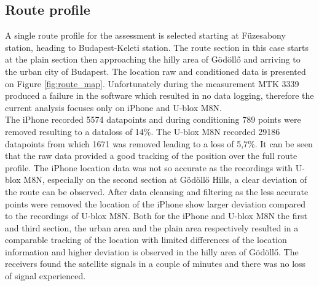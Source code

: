 \documentclass{article}
\begin{document}
		\subsection{Route profile}
			A single route profile for the assessment is selected starting at Füzesabony station, heading to Budapest-Keleti station. The route section in this case starts at the plain section then approaching the hilly area of Gödöllő and arriving to the urban city of Budapest. The location raw and conditioned data is presented on Figure \ref{fig:route_map}. Unfortunately during the measurement MTK 3339 produced a failure in the software which resulted in no data logging, therefore the current analysis focuses only on iPhone and U-blox M8N. \\
			The iPhone recorded 5574 datapoints and during conditioning 789 points were removed resulting to a dataloss of 14\%. The U-blox M8N recorded 29186 datapoints from which 1671 was removed leading to a loss of 5,7\%. It can be seen that the raw data provided a good tracking of the position over the full route profile. The iPhone location data was not so accurate as the recordings with U-blox M8N, especially on the second section at Gödöllő Hills, a clear deviation of the route can be observed. After data cleansing and filtering as the less accurate points were removed the location of the iPhone show larger deviation compared to the recordings of U-blox M8N. Both for the iPhone and U-blox M8N the first and third section, the urban area and the plain area respectively resulted in a comparable tracking of the location with limited differences of the location information and higher deviation is observed in the hilly area of Gödöllő. The receivers found the satellite signals in a couple of minutes and there was no loss of signal experienced.
\end{document}
